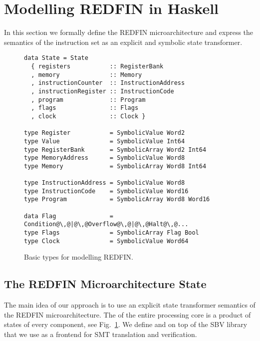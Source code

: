 \section{Modelling REDFIN in Haskell}\label{sec-transformer}

In this section we formally define the REDFIN microarchitecture and express the
semantics of the instruction set as an explicit and symbolic state transformer.

\begin{figure}[t]
\begin{verbatim}
data State = State
  { registers           :: RegisterBank
  , memory              :: Memory
  , instructionCounter  :: InstructionAddress
  , instructionRegister :: InstructionCode
  , program             :: Program
  , flags               :: Flags
  , clock               :: Clock }

type Register           = SymbolicValue Word2
type Value              = SymbolicValue Int64
type RegisterBank       = SymbolicArray Word2 Int64
type MemoryAddress      = SymbolicValue Word8
type Memory             = SymbolicArray Word8 Int64

type InstructionAddress = SymbolicValue Word8
type InstructionCode    = SymbolicValue Word16
type Program            = SymbolicArray Word8 Word16

data Flag               = Condition@\,@|@\,@Overflow@\,@|@\,@Halt@\,@...
type Flags              = SymbolicArray Flag Bool
type Clock              = SymbolicValue Word64
\end{verbatim}
\caption{Basic types for modelling REDFIN.\label{fig-types}}
\end{figure}

\subsection{The REDFIN Microarchitecture State}

The main idea of our approach is to use an explicit state transformer
semantics of the REDFIN microarchitecture. The  of the entire
processing core is a product of states of every component, see
Fig.~\ref{fig-types}. We define  and  on top
of the SBV library~\cite{SBV} that we use as a frontend for SMT translation and
verification.


